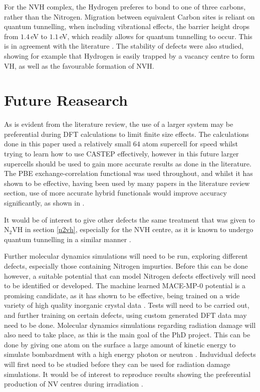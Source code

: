 \documentclass[10pt,a4paper,twocolumn,twoside]{extarticle}
\newcommand{\ntvh}{N$_2$VH}
\begin{document}
For the NVH complex, the Hydrogen preferes to bond to one of three carbons, rather than the Nitrogen. Migration between equivalent Carbon sites is reliant on quantum tunnelling, when including vibrational effects, the barrier height drops from $1.4$\,eV to $1.1$\,eV, which readily allows for quantum tunnelling to occur. This is in agreement with the literature \cite{Shaw_QT_VH}.
The stability of defects were also studied, showing for example that Hydrogen is easily trapped by a vacancy centre to form VH, as well as the favourable formation of NVH. 

\section{Future Reasearch}
\label{sec:future}
As is evident from the literature review, the use of a larger system may be preferential during DFT calculations to limit finite size effects. The calculations done in this paper used a relatively small $64$ atom supercell for speed whilst trying to learn how to use CASTEP effectively, however in this future larger supercells should be used to gain more accurate results as done in the literature.
The PBE exchange-correlation functional was used throughout, and whilst it has shown to be effective, having been used by many papers in the literature review section, use of more accurate hybrid functionals would improve accuracy significantly, as shown in \cite{Deak}. 

It would be of interest to give other defects the same treatment that was given to {\ntvh} in section \ref{n2vh}, especially for the NVH centre, as it is known to undergo quantum tunnelling in a similar manner \cite{Peaker,Shaw_QT_VH}.  

Further molecular dynamics simulations will need to be run, exploring different defects, especially those containing Nitrogen impurties. Before this can be done however, a suitable potential that can model Nitrogen defects effectively will need to be identified or developed. The machine learned MACE-MP-0 potential is a promising candidate, as it has shown to be effective, being trained on a wide variety of high quality inorganic crystal data \cite{MACE}. Tests will need to be carried out, and further training on certain defects, using custom generated DFT data may need to be done. Molecular dynamics simulations regarding radiation damage will also need to take place, as this is the main goal of the PhD project. This can be done by giving one atom on the surface a large amount of kinetic energy to simulate bombardment with a high energy photon or neutron \cite{radiation}. Induvidual defects will first need to be studied before they can be used for radiation damage simulations. It would be of interest to reproduce results showing the preferential production of NV centres during irradiation \cite{Deak}. %

\printbibliography
\end{document}
